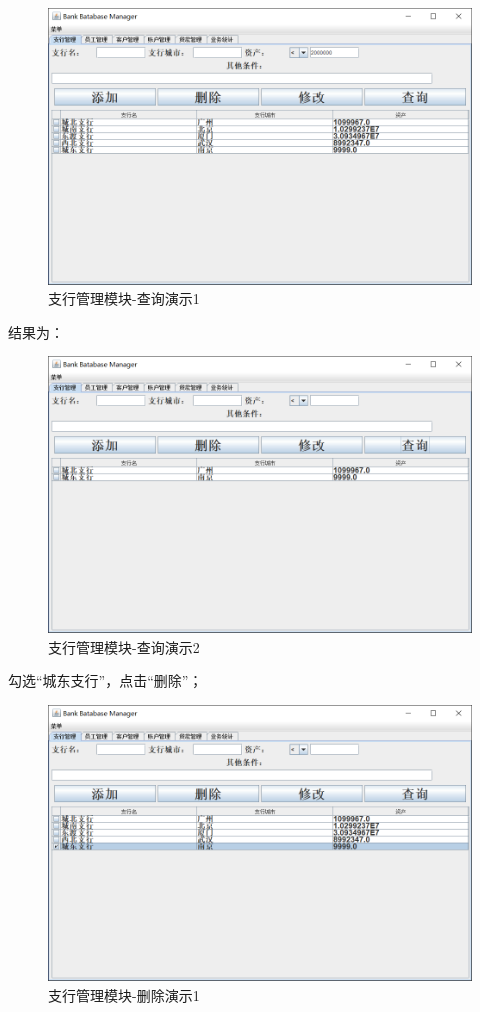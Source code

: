 \documentclass{ctexart}
\begin{document}
\begin{figure}[H]
    \centering
    \includegraphics[scale=0.2]{zhgl3.png}
    \caption{支行管理模块-查询演示1}
\end{figure}
\par 
结果为：
\begin{figure}[H]
    \centering
    \includegraphics[scale=0.2]{zhgl.png}
    \caption{支行管理模块-查询演示2}
\end{figure}
\par 
勾选“城东支行”，点击“删除”；
\begin{figure}[H]
    \centering
    \includegraphics[scale=0.2]{zhgl4.png}
    \caption{支行管理模块-删除演示1}
\end{figure}
\end{document}
